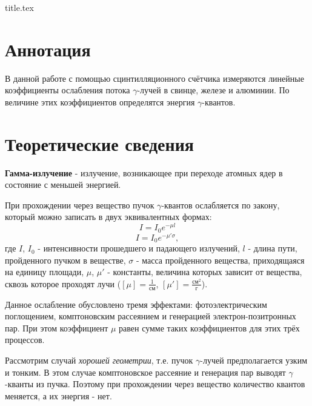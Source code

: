 \documentclass[12pt, a4paper, reqno]{article}
\begin{document}
{title.tex}

\newpage
\tableofcontents
\listoftables
\listoffigures

\newpage
\section{Аннотация}

    В данной работе с помощью сцинтилляционного счётчика измеряются линейные коэффициенты ослабления
    потока $\gamma$-лучей в свинце, железе и алюминии. По величине этих коэффициентов определятся
    энергия $\gamma$-квантов.

\section{Теоретические сведения}

    \textbf{Гамма-излучение} - излучение, возникающее при переходе атомных ядер в состояние с
    меньшей энергией.

    При прохождении через вещество пучок $\gamma$-квантов ослабляется по закону, который можно
    записать в двух эквивалентных формах:
    \begin{equation}\label{I_1}
        I = I_0 e^{-\mu l}
    \end{equation}
    \begin{equation}\label{I_2}
        I = I_0 e^{-\mu' \sigma},
    \end{equation}
    где $I$, $I_0$ - интенсивности прошедшего и падающего излучений, $l$ - длина пути, пройденного
    пучком в веществе, $\sigma$ - масса пройденного вещества, приходящаяся на единицу площади,
    $\mu$, $\mu'$ - константы, величина которых зависит от вещества, сквозь которое проходят лучи
    ($[\mu] = \frac{1}{\text{см}}$, $[\mu'] = \frac{\text{см}^2}{\text{г}}$).

    Данное ослабление обусловлено тремя эффектами: фотоэлектрическим поглощением, комптоновским
    рассеянием и генерацией электрон-позитронных пар. При этом коэффициент $\mu$ равен сумме таких
    коэффициентов для этих трёх процессов.

    Рассмотрим случай \textit{хорошей геометрии}, т.е. пучок $\gamma$-лучей предполагается узким и
    тонким. В этом случае комптоновское рассеяние и генерация пар выводят $\gamma$-кванты из пучка.
    Поэтому при прохождении через вещество количество квантов меняется, а их энергия - нет.
\end{document}
